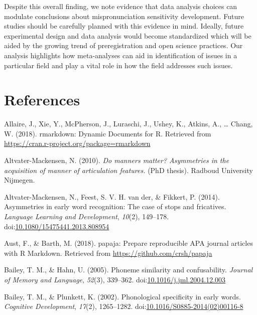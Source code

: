 \documentclass[
  man, noextraspace]{apa6}
\begin{document}
Despite this overall finding, we note evidence that data analysis choices can modulate conclusions about mispronunciation sensitivity development. Future studies should be carefully planned with this evidence in mind. Ideally, future experimental design and data analysis would become standardized which will be aided by the growing trend of preregistration and open science practices. Our analysis highlights how meta-analyses can aid in identification of issues in a particular field and play a vital role in how the field addresses such issues.

\newpage

\hypertarget{references}{%
\section{References}\label{references}}

\begingroup
\setlength{\parindent}{-0.5in}
\setlength{\leftskip}{0.5in}

\hypertarget{refs}{}
\leavevmode\hypertarget{ref-RMarkdown}{}%
Allaire, J., Xie, Y., McPherson, J., Luraschi, J., Ushey, K., Atkins, A., \ldots{} Chang, W. (2018). rmarkdown: Dynamic Documents for R. Retrieved from \url{https://cran.r-project.org/package=rmarkdown}

\leavevmode\hypertarget{ref-Altvater2010}{}%
Altvater-Mackensen, N. (2010). \emph{Do manners matter? Asymmetries in the acquisition of manner of articulation features.} (PhD thesis). Radboud University Nijmegen.

\leavevmode\hypertarget{ref-Altvater2014}{}%
Altvater-Mackensen, N., Feest, S. V. H. van der, \& Fikkert, P. (2014). Asymmetries in early word recognition: The case of stops and fricatives. \emph{Language Learning and Development}, \emph{10}(2), 149--178. doi:\href{https://doi.org/10.1080/15475441.2013.808954}{10.1080/15475441.2013.808954}

\leavevmode\hypertarget{ref-papaja}{}%
Aust, F., \& Barth, M. (2018). papaja: Prepare reproducible APA journal articles with R Markdown. Retrieved from \url{https://github.com/crsh/papaja}

\leavevmode\hypertarget{ref-Bailey2005}{}%
Bailey, T. M., \& Hahn, U. (2005). Phoneme similarity and confusability. \emph{Journal of Memory and Language}, \emph{52}(3), 339--362. doi:\href{https://doi.org/10.1016/j.jml.2004.12.003}{10.1016/j.jml.2004.12.003}

\leavevmode\hypertarget{ref-Bailey2002}{}%
Bailey, T. M., \& Plunkett, K. (2002). Phonological specificity in early words. \emph{Cognitive Development}, \emph{17}(2), 1265--1282. doi:\href{https://doi.org/10.1016/S0885-2014(02)00116-8}{10.1016/S0885-2014(02)00116-8}
\end{document}
